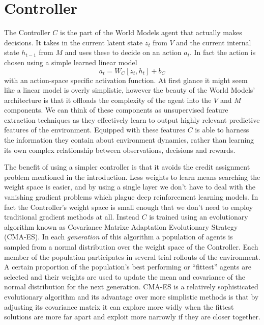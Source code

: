 \documentclass{article}
\numberwithin{figure}{section}
\theoremstyle{definition}
\begin{document}
\section{Controller}
The Controller $C$ is the part of the World Models agent that actually makes decisions.
It takes in the current latent state $z_t$ from $V$ and the current internal state $h_{t-1}$ from $M$ and uses these to decide on an action $a_t$.
In fact the action is chosen using a simple learned linear model
$$a_t = W_C [z_t, h_t] + b_C$$
with an action-space specific activation function.
At first glance it might seem like a linear model is overly simplistic, however the beauty of the World Models' architecture is that it offloads the complexity of the agent into the $V$ and $M$ components.
We can think of these components as unsupervised feature extraction techniques as they effectively learn to output highly relevant predictive features of the environment.
Equipped with these features $C$ is able to harness the information they contain about environment dynamics, rather than learning its own complex relationship between observations, decisions and rewards.

The benefit of using a simpler controller is that it avoids the credit assignment problem mentioned in the introduction.
Less weights to learn means searching the weight space is easier, and by using a single layer we don't have to deal with the vanishing gradient problems which plague deep reinforcement learning models.
In fact the Controller's weight space is small enough that we don't need to employ traditional gradient methods at all.
Instead $C$ is trained using an evolutionary algorithm known as Covariance Matrixe Adaptation Evolutionary Strategy (CMA-ES).
In each \textit{generation} of this algorithm a population of agents is sampled from a normal distribution over the weight space of the Controller.
Each member of the population participates in several trial rollouts of the environment.
A certain proportion of the population's best performing or ``fittest'' agents are selected and their weights are used to update the mean and covariance of the normal distribution for the next generation.
CMA-ES is a relatively sophisticated evolutionary algorithm and its advantage over more simplistic methods is that by adjusting its covariance matrix it can explore more widly when the fittest solutions are more far apart and exploit more narrowly if they are closer together.
\end{document}
